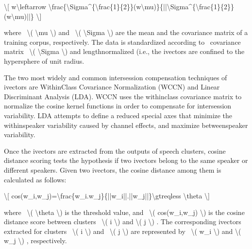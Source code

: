 \documentclass[letterpaper,10pt,english]{jupyterBook}
\begin{document}
\sphinxAtStartPar
\textbackslash{}{[} w\textbackslash{}leftarrow
\textbackslash{}frac\{\textbackslash{}Sigma\textasciicircum{}\{\sphinxhyphen{}\textbackslash{}frac\{1\}\{2\}\}(w\sphinxhyphen{}\textbackslash{}mu)\}\{||\textbackslash{}Sigma\textasciicircum{}\{\sphinxhyphen{}\textbackslash{}frac\{1\}\{2\}\}(w\sphinxhyphen{}\textbackslash{}mu)||\}
\textbackslash{}{]}

\sphinxAtStartPar
where  \textbackslash{}( \textbackslash{}mu \textbackslash{}) and  \textbackslash{}( \textbackslash{}Sigma \textbackslash{}) are the mean and the covariance
matrix of a training corpus, respectively. The data is standardized
according to  covariance matrix  \textbackslash{}( \textbackslash{}Sigma \textbackslash{}) and length\sphinxhyphen{}normalized
(i.e., the i\sphinxhyphen{}vectors are confined to the hypersphere of unit radius.

\sphinxAtStartPar
The two most widely and common intersession compensation techniques of
i\sphinxhyphen{}vectors are Within\sphinxhyphen{}Class Covariance Normalization (WCCN) and Linear
Discriminant Analysis (LDA). WCCN uses the within\sphinxhyphen{}class covariance
matrix to normalize the cosine kernel functions in order to compensate
for intersession variability. LDA attempts to define a reduced special
axes that minimize the within\sphinxhyphen{}speaker variability caused by channel
effects, and maximize between\sphinxhyphen{}speaker variability.

\sphinxAtStartPar
{}

\sphinxAtStartPar
Once the i\sphinxhyphen{}vectors are extracted from the outputs of speech clusters,
cosine distance scoring tests the hypothesis if two i\sphinxhyphen{}vectors belong to
the same speaker or different speakers. Given two i\sphinxhyphen{}vectors, the cosine
distance among them is calculated as follows:

\sphinxAtStartPar
\textbackslash{}{[} cos(w\_i,w\_j)=\textbackslash{}frac\{w\_i.w\_j\}\{||w\_i||.||w\_j||\}\textbackslash{}gtreqless
\textbackslash{}theta \textbackslash{}{]}

\sphinxAtStartPar
where  \textbackslash{}( \textbackslash{}theta \textbackslash{}) is the threshold value, and  \textbackslash{}( cos(w\_i,w\_j) \textbackslash{})
is the cosine distance score between clusters  \textbackslash{}( i \textbackslash{}) and \textbackslash{}( j \textbackslash{}) .
The corresponding i\sphinxhyphen{}vectors extracted for clusters  \textbackslash{}( i \textbackslash{}) and  \textbackslash{}( j
\textbackslash{}) are represented by  \textbackslash{}( w\_i \textbackslash{}) and \textbackslash{}( w\_j \textbackslash{}) , respectively.
\end{document}
